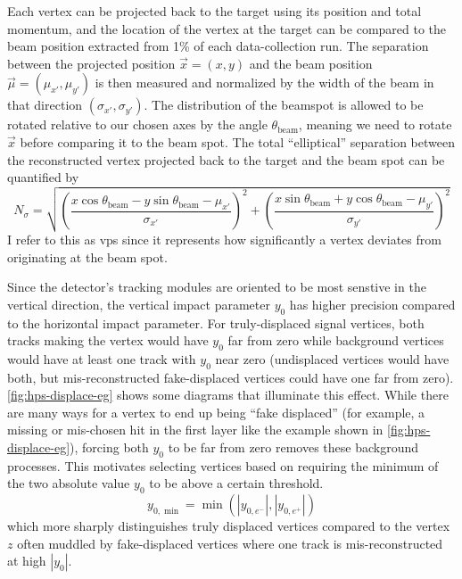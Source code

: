 Each vertex can be projected back to the target using its position and total momentum,
and the location of the vertex at the target can be compared to the beam
position extracted from 1\% of each data-collection run.
The separation between the projected position $\vec{x} = (x,y)$ and the beam position
$\vec{\mu} = (\mu_{x'}, \mu_{y'})$ is then measured
and normalized by the width of the beam in that direction $(\sigma_{x'},\sigma_{y'})$.
The distribution of the beamspot is allowed to be rotated relative to our
chosen axes by the angle $\theta_\mathrm{beam}$, meaning we need to rotate $\vec{x}$
before comparing it to the beam spot.
The total ``elliptical'' separation between the reconstructed vertex
projected back to the target and the beam spot can be quantified by
\begin{equation}
  N_\sigma = \sqrt{
    \left(
      \frac{x\cos\theta_\mathrm{beam} - y\sin\theta_\mathrm{beam} - \mu_{x'}}{\sigma_{x'}}
    \right)^2
    +\left(
      \frac{x\sin\theta_\mathrm{beam} + y\cos\theta_\mathrm{beam} - \mu_{y'}}{\sigma_{y'}}
    \right)^2
  }
\end{equation}
I refer to this as \ac{vps} since it represents how significantly
a vertex deviates from originating at the beam spot.

Since the detector's tracking modules are oriented to be most senstive in the
vertical direction, the vertical impact parameter $y_0$ has higher precision compared
to the horizontal impact parameter.
For truly-displaced signal vertices, both tracks making the vertex would have
$y_0$ far from zero while background vertices would have at least one track
with $y_0$ near zero (undisplaced vertices would have both, but mis-reconstructed
fake-displaced vertices could have one far from zero).
\cref{fig:hps-displace-eg} shows some diagrams that illuminate this effect.
While there are many ways for a vertex to end up being ``fake displaced''
(for example, a missing or mis-chosen hit in the first layer like the example shown
in \cref{fig:hps-displace-eg}), forcing both $y_0$ to be far from zero removes
these background processes.
This motivates selecting vertices based on requiring the minimum of the two
absolute value $y_0$ to be above a certain threshold.
\begin{equation}
  y_{0,\min} = \min(|y_{0,e^-}|,|y_{0,e^+}|)
\end{equation}
which more sharply distinguishes truly displaced vertices compared to the
vertex $z$ often muddled by fake-displaced vertices where one track is
mis-reconstructed at high $|y_0|$.

